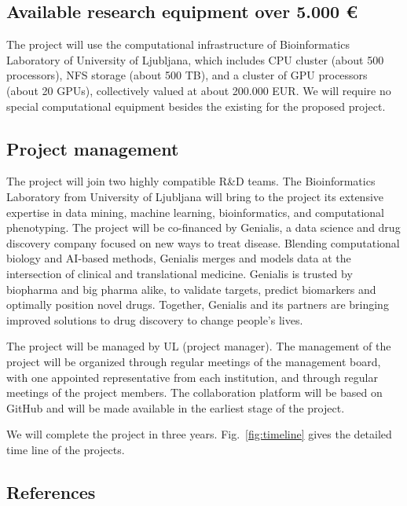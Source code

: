 \documentclass[11pt,a4paper]{article}
\begin{document}
\subsection{Available research equipment over 5.000 €}

The project will use the computational infrastructure of Bioinformatics Laboratory of University of Ljubljana, which includes CPU cluster (about 500 processors), NFS storage (about 500 TB), and a cluster of GPU processors (about 20 GPUs), collectively valued at about 200.000 EUR. We will require no special computational equipment besides the existing for the proposed project.

\subsection{Project management}

The project will join two highly compatible R\&D teams. The Bioinformatics Laboratory from University of Ljubljana will bring to the project its extensive expertise in data mining, machine learning, bioinformatics, and computational phenotyping. The project will be co-financed by Genialis, a data science and drug discovery company focused on new ways to treat disease. Blending computational biology and AI-based methods, Genialis merges and models data at the intersection of clinical and translational medicine. Genialis is trusted by biopharma and big pharma alike, to validate targets, predict biomarkers and optimally position novel drugs. Together, Genialis and its partners are bringing improved solutions to drug discovery to change people's lives.

The project will be managed by UL (project manager). The management of the project will be organized through regular meetings of the management board, with one appointed representative from each institution, and through regular meetings of the project members. The collaboration platform will be based on GitHub and will be made available in the earliest stage of the project.

We will complete the project in three years. Fig.~\ref{fig:timeline} gives the detailed time line of the projects.



\subsection*{References}


\begin{multicols}{2}
\footnotesize
\setlength{\parskip}{0em}
\renewcommand{\baselinestretch}{1.0}


\end{multicols}
\end{document}
